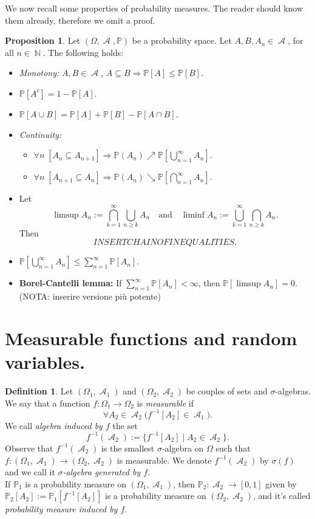 \documentclass[12pt,a4paper]{report}
\theoremstyle{definition}
\newtheorem{proposition}[theorem]{Proposition}
\newtheorem{definition}[theorem]{Definition}
\theoremstyle{num.custom-title}
\DeclareMathOperator{\A}{\mathcal{A}}
\DeclareMathOperator{\N}{\mathbb{N}}
\DeclareMathOperator{\imp}{\Rightarrow}
\DeclareMathOperator{\sse}{\subseteq}
\renewcommand{\1}{\mathbbm{1}}
\renewcommand{\P}{\mathbb{P}}
\begin{document}
We now recall some properties of probability measures. The reader should know them already, therefore we omit a proof.

\begin{proposition}
Let $(\Omega, \A, \P)$ be a probability space. Let $A,B,A_n \in \A$, for all $n \in \N$. The following holds:
\begin{itemize}
\item \emph{Monotony:} $A,B \in \A$, $A \sse B \imp \P[A] \leq \P[B]$.
\item $\P[A^c] = 1-\P[A]$.
\item $\P[A \cup B] = \P[A]+\P[B] - \P[A \cap B]$.
\item \emph{Continuity:} 
\begin{itemize}
\item $\forall n \; [A_n \sse A_{n+1}] \imp \P(A_n) \nearrow \P \left[ \bigcup_{n=1}^\infty A_n \right]$.
\item $\forall n \; [A_{n+1} \sse A_n] \imp \P(A_n) \searrow \P \left[ \bigcap_{n=1}^\infty A_n \right]$.
\end{itemize}
\item Let 
\[
\limsup A_n := \bigcap_{k=1}^\infty \bigcup_{n \geq k} A_n \quad \text{and} \quad \liminf A_n := \bigcup_{k=1}^\infty \bigcap_{n \geq k} A_n.
\]
Then
\[
INSERT CHAIN OF INEQUALITIES.
\]
\item $\displaystyle \P \left[ \bigcup_{n=1}^\infty A_n \right] \leq \sum_{n=1}^\infty \P[A_n]$.
\item \textbf{Borel-Cantelli lemma:} If $\sum_{n=1}^\infty \P[A_n] < \infty$, then $\P[\limsup A_n]=0$. (NOTA: inserire versione più potente)
\end{itemize}
\end{proposition}

\section{Measurable functions and random variables.}

\begin{definition}\label{def_meas_fun}
Let $(\Omega_1,\A_1)$ and $(\Omega_2,\A_2)$ be couples of sets and $\sigma$-algebras. We say that a function $f : \Omega_1 \to \Omega_2$ is \emph{measurable} if
\[
\forall A_2 \in \A_2 \Big( f^{-1}[A_2] \in \A_1 \Big).
\]
We call \emph{algebra induced by $f$} the set
\[
f^{-1}(\A_2) := \{f^{-1}[A_2] \mid A_2 \in \A_2\}.
\]
Observe that $f^{-1}(\A_2)$ is the smallest $\sigma$-algebra on $\Omega$ such that $f : (\Omega_1, \A_1) \to (\Omega_2, \A_2)$ is measurable. We denote $f^{-1}(\A_2)$ by $\sigma(f)$ and we call it \emph{$\sigma$-algebra generated by $f$}.\\
If $\P_1$ is a probability measure on $(\Omega_1,\A_1)$, then $\P_2 : \A_2 \to [0,1]$ given by $\P_2[A_2] := \P_1[f^{-1}[A_2]]$ is a probability measure on $(\Omega_2,\A_2)$, and it's called \emph{probability measure induced by $f$}.
\end{definition}
\end{document}
